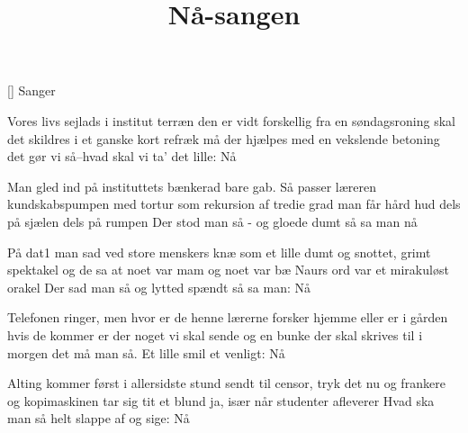 \documentclass[a4paper,11pt]{article}
\title{Nå-sangen}
\author{}
\begin{document}
\maketitle

\begin{roles}
[] Sanger
\end{roles}

\begin{song}
Vores livs sejlads i institut terræn
den er vidt forskellig fra en søndagsroning
skal det skildres i et ganske kort refræk
må der hjælpes med en vekslende betoning
det gør vi så--hvad skal vi ta'
det lille: Nå

Man gled ind på instituttets bænkerad
bare gab.  Så passer læreren kundskabspumpen
med tortur som rekursion af tredie grad
man får hård hud dels på sjælen dels på rumpen
Der stod man så - og gloede dumt
så sa man nå

På dat1 man sad ved store menskers knæ
som et lille dumt og snottet, grimt spektakel
og de sa at noet var mam og noet var bæ
Naurs ord var et mirakuløst orakel
Der sad man så og lytted spændt
så sa man: Nå

Telefonen ringer, men hvor er de henne
lærerne forsker hjemme eller er i gården
hvis de kommer er der noget vi skal sende
og en bunke der skal skrives til i morgen
det må man så.  Et lille smil
et venligt: Nå

Alting kommer først i allersidste stund
sendt til censor, tryk det nu og frankere
og kopimaskinen tar sig tit et blund
ja, især når studenter afleverer
Hvad ska man så helt slappe af
og sige: Nå
\end{song}
\end{document}
